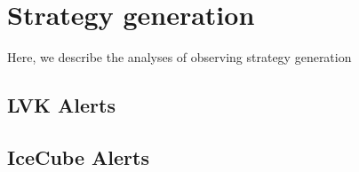 \section{Strategy generation}\label{sec:stratGen}

Here, we describe the analyses of observing strategy generation

\subsection{LVK Alerts}\label{subsec:strategy-LVK}

\subsection{IceCube Alerts}\label{subsec:strategy-IceCube}

\newpage